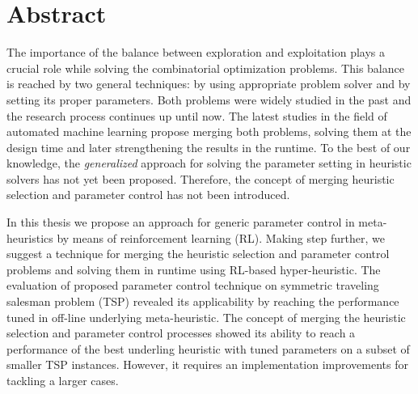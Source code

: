 \newpage
\section*{Abstract}
The importance of the balance between exploration and exploitation plays a crucial role while solving the combinatorial optimization problems. This balance is reached by two general techniques: by using appropriate problem solver and by setting its proper parameters. Both problems were widely studied in the past and the research process continues up until now. The latest studies in the field of automated machine learning propose merging both problems, solving them at the design time and later strengthening the results in the runtime. To the best of our knowledge, the \emph{generalized} approach for solving the parameter setting in heuristic solvers has not yet been proposed. Therefore, the concept of merging heuristic selection and parameter control has not been introduced.

In this thesis we propose an approach for generic parameter control in meta-heuristics by means of reinforcement learning (RL). Making step further, we suggest a technique for merging the heuristic selection and parameter control problems and solving them in runtime using RL-based hyper-heuristic. The evaluation of proposed parameter control technique on symmetric traveling salesman problem (TSP) revealed its applicability by reaching the performance tuned in off-line underlying meta-heuristic. The concept of merging the heuristic selection and parameter control processes showed its ability to reach a performance of the best underling heuristic with tuned parameters on a subset of smaller TSP instances. However, it requires an implementation improvements for tackling a larger cases.